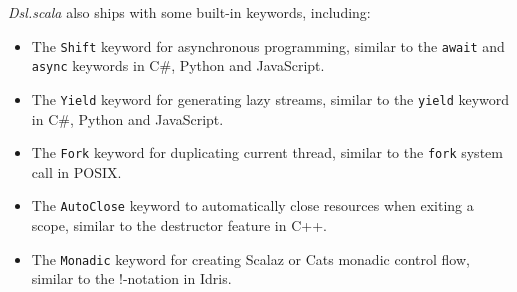 \textit{Dsl.scala} also ships with some built-in keywords, including:
\begin{itemize}
  \item The \lstinline{Shift} keyword for asynchronous programming, similar to the \lstinline{await} and \lstinline{async} keywords in C\#, Python and JavaScript.
  \item The \lstinline{Yield} keyword for generating lazy streams, similar to the \lstinline{yield} keyword in C\#, Python and JavaScript.
  \item The \lstinline{Fork} keyword for duplicating current thread, similar to the \lstinline{fork} system call in POSIX.
  \item The \lstinline{AutoClose} keyword to automatically close resources when exiting a scope, similar to the destructor feature in C++.
  \item The \lstinline{Monadic} keyword for creating Scalaz \cite{kenji2017scalaz} or Cats \cite{typelevel2017cats} monadic control flow, similar to the !-notation in Idris\cite{brady2013idris}.
\end{itemize}
 






